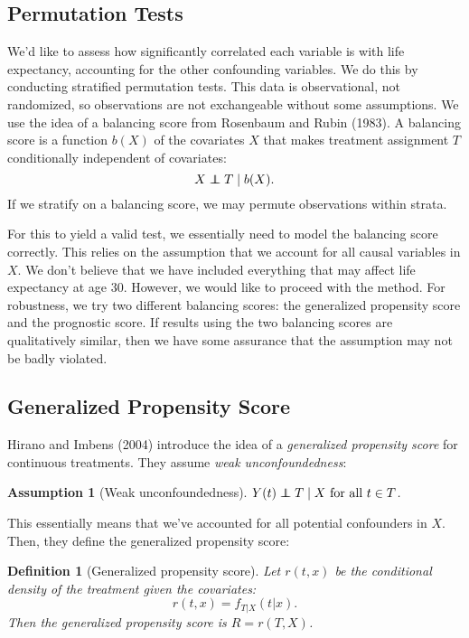 \documentclass[11pt]{article}\usepackage[]{graphicx}\usepackage[]{color}
\newtheorem{assumption}{Assumption}
\newtheorem{definition}{Definition}
\newcommand\independent{\protect\mathpalette{\protect\independenT}{\perp}}
\def\independenT#1#2{\mathrel{\rlap{$#1#2$}\mkern2mu{#1#2}}}
\begin{document}
\subsection{Permutation Tests}
We'd like to assess how significantly correlated each variable is with life expectancy, accounting for the other confounding variables.
We do this by conducting stratified permutation tests.
This data is observational, not randomized, so observations are not exchangeable without some assumptions.
We use the idea of a balancing score from Rosenbaum and Rubin (1983).
A balancing score is a function $b(X)$ of the covariates $X$ that makes treatment assignment $T$ conditionally independent of covariates:
$$X \independent T \mid b(X).$$
If we stratify on a balancing score, we may permute observations within strata.

For this to yield a valid test, we essentially need to model the balancing score correctly.
This relies on the assumption that we account for all causal variables in $X$.
We don't believe that we have included everything that may affect life expectancy at age 30.
However, we would like to proceed with the method.
For robustness, we try two different balancing scores: the generalized propensity score and the prognostic score.
If results using the two balancing scores are qualitatively similar, then we have some assurance that the assumption may not be badly violated.

\subsection{Generalized Propensity Score}
Hirano and Imbens (2004) introduce the idea of a \textit{generalized propensity score} for continuous treatments.
They assume \textit{weak unconfoundedness}:
\begin{assumption}[Weak unconfoundedness] $Y(t) \independent T \mid X \text{ for all } t \in T$.
\end{assumption}
This essentially means that we've accounted for all potential confounders in $X$.
Then, they define the generalized propensity score:

\begin{definition}[Generalized propensity score]
Let $r(t, x)$ be the conditional density of the treatment given the covariates:
$$r(t, x) = f_{T | X} (t|x).$$ 
Then the generalized propensity score is $R = r(T, X)$.
\end{definition}
\end{document}
